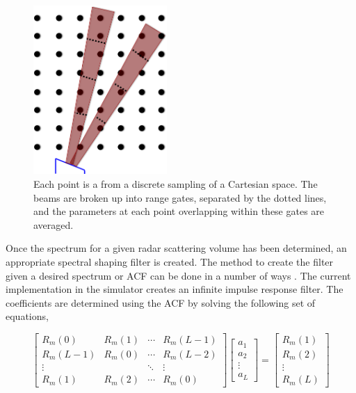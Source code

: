 \documentclass[draft,ras]{agutex}
\begin{document}
\begin{article}
\begin{figure}[!t]
\centering
\includegraphics[width=2in]{beamsampling}
\caption{Each point is a from a discrete sampling of a Cartesian space. The beams are broken up into range gates, separated by the dotted lines, and the parameters at each point overlapping within these gates are averaged.}
\label{fig:beamdia}
\end{figure}
 


Once the spectrum for a given radar scattering volume has been determined, an appropriate spectral shaping filter is created. The method to create the filter given a desired spectrum or ACF can be done in a number of ways \citep{Kasdin:1995wi}. The current implementation in the simulator creates an infinite impulse response filter. The coefficients are determined using the ACF by solving the following set of equations,

\begin{equation}
\label{eq:filtereq}
\begin{bmatrix} R_m(0) & R_m(1)& \cdots & R_m(L-1) \\ R_m(L-1) & R_m(0)& \cdots & R_m(L-2)\\ \vdots & &\ddots  & \vdots \\  R_m(1) & R_m(2) & \cdots & R_m(0) \end{bmatrix} \left[ \begin{array}{c} a_1\\ a_2\\\vdots \\ a_L \end{array} \right]=\left[ \begin{array}{c} R_m(1) \\ R_m(2)\\ \vdots \\R_m(L) \end{array} \right]
\end{equation}


\end{article}
\end{document}
